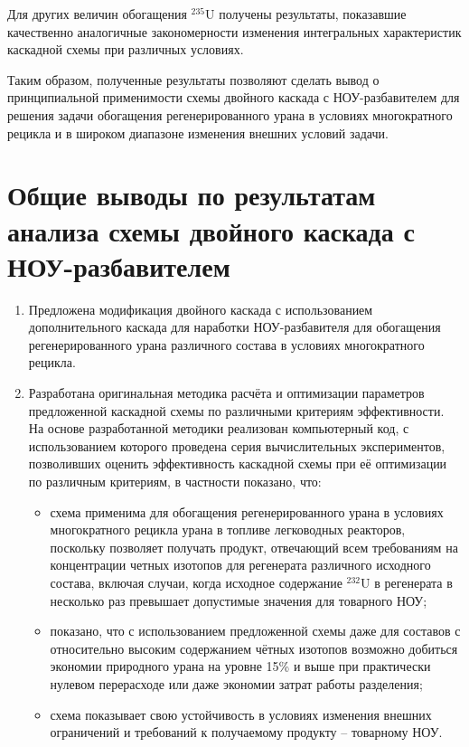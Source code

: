 Для других величин обогащения $^{235}$U получены результаты, показавшие качественно аналогичные закономерности изменения интегральных характеристик каскадной схемы при различных условиях. 

Таким образом, полученные результаты позволяют сделать вывод о принципиальной применимости схемы двойного каскада с НОУ-разбавителем для решения задачи обогащения регенерированного урана в условиях многократного рецикла и в широком диапазоне изменения внешних условий задачи.    


\section{Общие выводы по результатам анализа схемы двойного каскада с НОУ-разбавителем}

\begin{enumerate}
    \item Предложена модификация двойного каскада с использованием дополнительного каскада для наработки НОУ-разбавителя для обогащения регенерированного урана различного состава в условиях многократного рецикла.
    \item Разработана оригинальная методика расчёта и оптимизации параметров предложенной каскадной схемы по различными критериям эффективности. На основе разработанной методики реализован компьютерный код, с использованием которого проведена серия вычислительных экспериментов, позволивших оценить эффективность каскадной схемы при её оптимизации по различным критериям, в частности показано, что:
    \begin{itemize}
    \item схема применима для обогащения регенерированного урана в условиях многократного рецикла урана в топливе легководных реакторов, поскольку позволяет получать продукт, отвечающий всем требованиям на концентрации четных изотопов для регенерата различного исходного состава, включая случаи, когда исходное содержание $^{232}$U в регенерата в несколько раз превышает допустимые значения для товарного НОУ;
    \item показано, что с использованием предложенной схемы даже для составов с относительно высоким содержанием чётных изотопов возможно добиться экономии природного урана на уровне 15\% и выше при практически нулевом перерасходе или даже экономии затрат работы разделения;
    \item схема показывает свою устойчивость в условиях изменения внешних ограничений и требований к получаемому продукту -- товарному НОУ. 
\end{itemize}
       

\end{enumerate}
